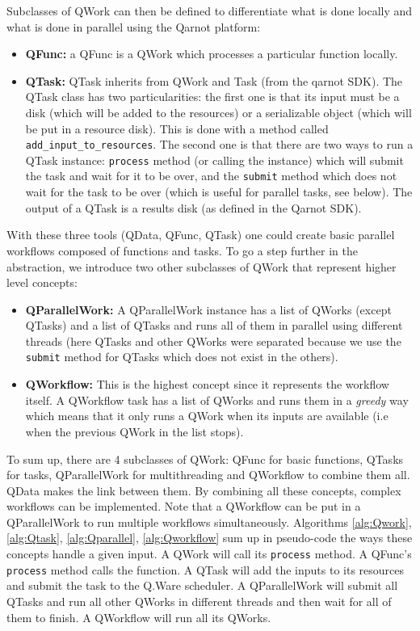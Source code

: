 \documentclass[10pt, conference, compsocconf]{IEEEtran}
\begin{document}
Subclasses of QWork can then be defined to differentiate what is done locally and what is done in parallel using the Qarnot platform: 
\begin{itemize}
\item \textbf{QFunc:} a QFunc is a QWork which processes a particular function locally.
\item \textbf{QTask:} QTask inherits from QWork and Task (from the qarnot SDK). The QTask class has two particularities: 
the first one is that its input must be a disk (which will be added to the resources) or a serializable object (which will be put in a resource disk). This is done with a method called \texttt{add\_input\_to\_resources}. The second one is that there are two ways to run a QTask instance: \texttt{process} method (or calling the instance) which will submit the task and wait for it to be over, and the \texttt{submit} method which does not wait for the task to be over (which is useful for parallel tasks, see below). The output of a QTask is a results disk (as defined in the Qarnot SDK).
\end{itemize}
With these three tools (QData, QFunc, QTask) one could create basic parallel workflows composed of functions and tasks. To go a step further in the abstraction, we introduce two other subclasses of QWork that represent higher level concepts: 
\begin{itemize}
\item \textbf{QParallelWork:} A QParallelWork instance has a list of QWorks (except QTasks) and a list of QTasks and runs all of them in parallel using different threads (here QTasks and other QWorks were separated because we use the \texttt{submit} method for QTasks which does not exist in the others).
\item \textbf{QWorkflow:} This is the highest concept since it represents the workflow itself. A QWorkflow task has a list of QWorks and runs them in a {\it greedy} way which means that it only runs a QWork when its inputs are available (i.e when the previous QWork in the list stops).
\end{itemize}

To sum up, there are 4 subclasses of QWork: QFunc for basic functions, QTasks for tasks, QParallelWork for multithreading and QWorkflow to combine them all. QData makes the link between them.
By combining all these concepts, complex workflows can be implemented. Note that a QWorkflow can be put in a QParallelWork to run multiple workflows simultaneously. 
Algorithms \ref{alg:Qwork}, \ref{alg:Qtask}, \ref{alg:Qparallel}, \ref{alg:Qworkflow} sum up in pseudo-code the ways these concepts handle a given input. A QWork will call its \texttt{process} method. A QFunc's \texttt{process} method calls the function. A QTask will add the inputs to its resources and submit the task to the Q.Ware scheduler. A QParallelWork will submit all QTasks and run all other QWorks in different threads and then wait for all of them to finish. A QWorkflow will run all its QWorks.
\end{document}
